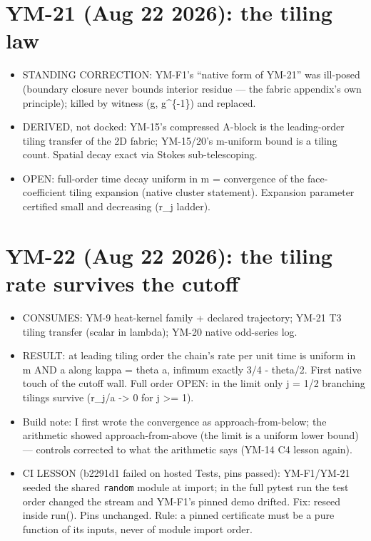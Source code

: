 \hypertarget{ym-21-aug-22-2026-the-tiling-law}{%
\section{YM-21 (Aug 22 2026): the tiling law}\label{ym-21-aug-22-2026-the-tiling-law}}

\begin{itemize}
\tightlist
\item
  STANDING CORRECTION: YM-F1's ``native form of YM-21'' was ill-posed
  (boundary closure never bounds interior residue --- the fabric
  appendix's own principle); killed by witness (g, g\^{}\{-1\}) and replaced.
\item
  DERIVED, not docked: YM-15's compressed A-block is the leading-order
  tiling transfer of the 2D fabric; YM-15/20's m-uniform bound is a
  tiling count. Spatial decay exact via Stokes sub-telescoping.
\item
  OPEN: full-order time decay uniform in m = convergence of the
  face-coefficient tiling expansion (native cluster statement).
  Expansion parameter certified small and decreasing (r\_j ladder).
\end{itemize}

\hypertarget{ym-22-aug-22-2026-the-tiling-rate-survives-the-cutoff}{%
\section{YM-22 (Aug 22 2026): the tiling rate survives the cutoff}\label{ym-22-aug-22-2026-the-tiling-rate-survives-the-cutoff}}

\begin{itemize}
\tightlist
\item
  CONSUMES: YM-9 heat-kernel family + declared trajectory; YM-21 T3
  tiling transfer (scalar in lambda); YM-20 native odd-series log.
\item
  RESULT: at leading tiling order the chain's rate per unit time is
  uniform in m AND a along kappa = theta a, infimum exactly 3/4 - theta/2.
  First native touch of the cutoff wall. Full order OPEN: in the limit
  only j = 1/2 branching tilings survive (r\_j/a -\textgreater{} 0 for j \textgreater= 1).
\item
  Build note: I first wrote the convergence as approach-from-below; the
  arithmetic showed approach-from-above (the limit is a uniform lower
  bound) --- controls corrected to what the arithmetic says (YM-14 C4
  lesson again).
\item
  CI LESSON (b2291d1 failed on hosted Tests, pins passed): YM-F1/YM-21
  seeded the shared \texttt{random} module at import; in the full pytest run
  the test order changed the stream and YM-F1's pinned demo drifted.
  Fix: reseed inside run(). Pins unchanged. Rule: a pinned certificate
  must be a pure function of its inputs, never of module import order.
\end{itemize}

